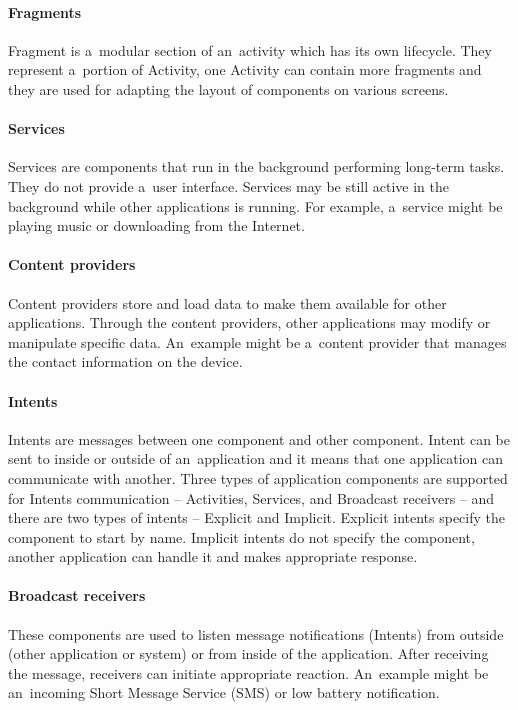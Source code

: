 \paragraph{Fragments}
Fragment is a~modular section of an~activity which has its own lifecycle. They represent a~portion of Activity, one
Activity can contain more fragments and they are used for adapting the layout of components on various screens.

\paragraph{Services}
Services are components that run in the background performing long-term tasks. They do not provide a~user interface.
Services may be still active in the background while other applications is running. For example, a~service might be
playing music or downloading from the Internet.

\paragraph{Content providers}
Content providers store and load data to make them available for other applications. Through the content providers,
other applications may modify or manipulate specific data. An~example might be a~content provider that manages the
contact information on the device.

\paragraph{Intents}
Intents are messages between one component and other component. Intent can be sent to inside or outside of
an~application and it means that one application can communicate with another. Three types of application components
are supported for Intents communication -- Activities, Services, and Broadcast receivers -- and there are two types of
intents -- Explicit and Implicit. Explicit intents specify the component to start by name. Implicit intents do not
specify the component, another application can handle it and makes appropriate response.

\paragraph{Broadcast receivers}
These components are used to listen message notifications (Intents) from outside (other application or system) or from
inside of the application. After receiving the message, receivers can initiate appropriate reaction. An~example might be
an~incoming Short Message Service (SMS) or low battery notification.

